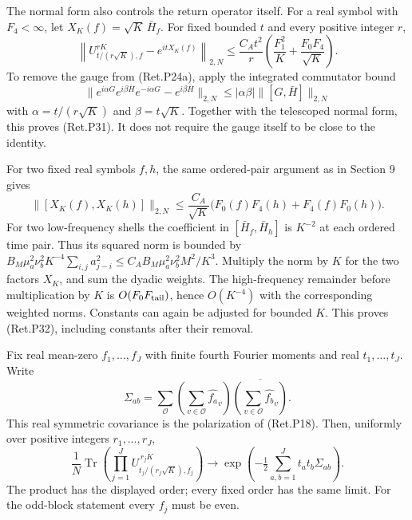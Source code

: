 The normal form also controls the return operator itself. For a real
symbol with \(F_4<\infty\), let \(X_K(f)=\sqrt K\,\bar H_f\).
For fixed bounded \(t\) and every positive integer \(r\),
\[
 \left\|U_{t/(r\sqrt K),f}^{rK}-e^{itX_K(f)}\right\|_{2,N}
 \le \frac{C_A t^2}{r}
                   \left(\frac{F_1^2}{K}+\frac{F_0F_4}{\sqrt K}\right).
                                                               \tag{Ret.P31}
\]
To remove the gauge from (Ret.P24a), apply the integrated commutator bound
\[
 \|e^{i\alpha G}e^{i\beta\bar H}e^{-i\alpha G}
                                  -e^{i\beta\bar H}\|_{2,N}
                     \le|\alpha\beta|\|[G,\bar H]\|_{2,N}
\]
with \(\alpha=t/(r\sqrt K)\) and \(\beta=t\sqrt K\).
Together with the telescoped normal form, this proves (Ret.P31).
It does not require the gauge itself to be close to the identity.

For two fixed real symbols \(f,h\), the same ordered-pair argument as in
Section 9 gives
\[
 \|[X_K(f),X_K(h)]\|_{2,N}
 \le\frac{C_A}{\sqrt K}
              \bigl(F_0(f)F_4(h)+F_4(f)F_0(h)\bigr).        \tag{Ret.P32}
\]
For two low-frequency shells the coefficient in
\([\bar H_f,\bar H_h]\) is \(K^{-2}\) at each ordered time pair.
Thus its squared norm is bounded by
\(B_M\mu_a^2\nu_b^2K^{-4}\sum_{i,j}a_{j-i}^2 \le C_AB_M\mu_a^2\nu_b^2M^2/K^3\).
Multiply the norm by \(K\) for the two factors \(X_K\), and sum the
dyadic weights. The high-frequency remainder before multiplication
by \(K\) is \(O(F_0F_{\rm tail})\), hence \(O(K^{-4})\) with the
corresponding weighted norms. Constants can again be adjusted for
bounded \(K\). This proves (Ret.P32), including constants after their removal.

\begin{theorem}\label{pass1:return_periodic-8} Fix real mean-zero
\(f_1,\ldots,f_J\) with finite fourth Fourier moments and real
\(t_1,\ldots,t_J\). Write
\[
 \Sigma_{ab}=\sum_{\mathcal O}
       \left(\sum_{v\in\mathcal O}\widehat{f_a}_v\right)
       \overline{\left(\sum_{v\in\mathcal O}\widehat{f_b}_v\right)} .
\]
This real symmetric covariance is the polarization of (Ret.P18).
Then, uniformly over positive integers \(r_1,\ldots,r_J\),
\[
 \frac1N\operatorname{Tr}
       \left(\prod_{j=1}^J
               U_{t_j/(r_j\sqrt K),f_j}^{\,r_jK}\right)
 \longrightarrow
       \exp\left(-\tfrac12\sum_{a,b=1}^Jt_at_b\Sigma_{ab}\right).
                                                               \tag{Ret.P33}
\]
The product has the displayed order; every fixed order has the same limit.
For the odd-block statement every \(f_j\) must be even.
\end{theorem}

